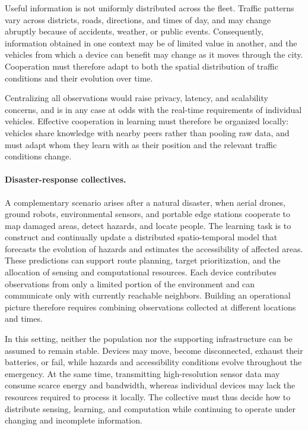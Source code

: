 Useful information is not uniformly distributed across the fleet. 
%
Traffic patterns vary across districts, roads, directions, and times of day, 
 and may change abruptly because of accidents, weather, or public events. 
% 
Consequently,
 information obtained in one context may be of limited value in another, 
 and the vehicles from which a device can benefit may change as it moves through the city. 
% 
Cooperation must therefore adapt to both the spatial distribution 
 of traffic conditions and their evolution over time.

Centralizing all observations would raise privacy, latency, and scalability concerns,
 and is in any case at odds with the real-time requirements of individual vehicles.
%
Effective cooperation in learning must therefore be organized locally:
 vehicles share knowledge with nearby peers rather than pooling raw data,
 and must adapt whom they learn with as their position and the relevant traffic
 conditions change.

\paragraph{Disaster-response collectives.}
A complementary scenario arises after a natural disaster, 
 when aerial drones, ground robots, environmental sensors, 
 and portable edge stations cooperate to map damaged areas, detect hazards, 
 and locate people. 
% 
The learning task is to construct and continually update a distributed
 spatio-temporal model that forecasts the evolution of hazards and estimates
 the accessibility of affected areas.
%
These predictions can support route planning, target prioritization,
 and the allocation of sensing and computational resources.
%
Each device contributes observations from only a limited portion of the environment
 and can communicate only with currently reachable neighbors.
% 
Building an operational picture therefore requires
 combining observations collected at different locations and times.

In this setting, 
 neither the population nor the supporting infrastructure can be assumed to remain stable. 
% 
Devices may move, become disconnected, exhaust their batteries, or fail, 
 while hazards and accessibility conditions evolve throughout the emergency. 
% 
At the same time, 
 transmitting high-resolution sensor data may consume scarce energy and bandwidth, 
 whereas individual devices may lack the resources required to process it locally. 
% 
The collective must thus decide how to distribute sensing, learning, 
 and computation while continuing to operate under changing and incomplete information.


